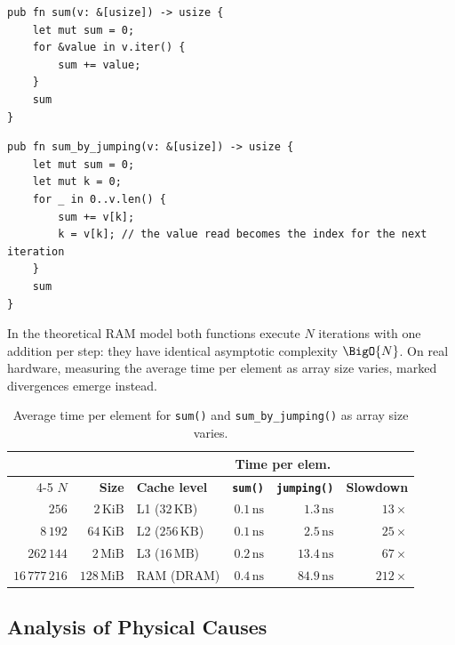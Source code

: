 \begin{lstlisting}[style=rustcode,caption={Linear sequential scan.}]
pub fn sum(v: &[usize]) -> usize {
    let mut sum = 0;
    for &value in v.iter() {
        sum += value;
    }
    sum
}
\end{lstlisting}

\begin{lstlisting}[style=rustcode,caption={Scan via random jumps (\textit{pointer chasing}).}]
pub fn sum_by_jumping(v: &[usize]) -> usize {
    let mut sum = 0;
    let mut k = 0;
    for _ in 0..v.len() {
        sum += v[k];
        k = v[k]; // the value read becomes the index for the next iteration
    }
    sum
}
\end{lstlisting}

In the theoretical RAM model both functions execute $N$ iterations with one addition per step: they have identical asymptotic complexity $\BigO{N}$. On real hardware, measuring the average time per element as array size varies, marked divergences emerge instead.

\begin{table}[htbp]
  \centering
  \small
  \setlength{\tabcolsep}{6pt}
  \begin{tabular}{r r l r r r}
    \toprule
    & & & \multicolumn{2}{c}{\textbf{Time per elem.}} & \\
    \cmidrule(lr){4-5}
    \textbf{$N$} & \textbf{Size} & \textbf{Cache level} & \textbf{\texttt{sum()}} & \textbf{\texttt{jumping()}} & \textbf{Slowdown} \\
    \midrule
    $256$         & $2\,\text{KiB}$   & L1 ($32\,\text{KB}$)  & $0.1\,\text{ns}$ & $1.3\,\text{ns}$  & $13\times$  \\
    $8\,192$      & $64\,\text{KiB}$  & L2 ($256\,\text{KB}$) & $0.1\,\text{ns}$ & $2.5\,\text{ns}$  & $25\times$  \\
    $262\,144$    & $2\,\text{MiB}$   & L3 ($16\,\text{MB}$)  & $0.2\,\text{ns}$ & $13.4\,\text{ns}$ & $67\times$  \\
    $16\,777\,216$& $128\,\text{MiB}$ & RAM (DRAM)            & $0.4\,\text{ns}$ & $84.9\,\text{ns}$ & $212\times$ \\
    \bottomrule
  \end{tabular}
  \caption{Average time per element for \texttt{sum()} and \texttt{sum\_by\_jumping()} as array size varies.}
  \label{tab:pointer-chasing-benchmark-en}
\end{table}

\subsection{Analysis of Physical Causes}

